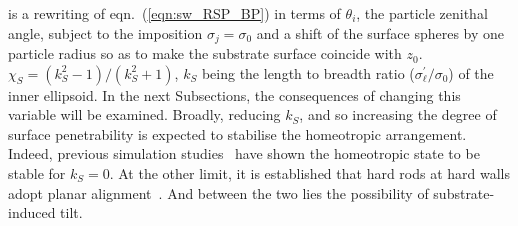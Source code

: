 \documentclass[aps,10pt,twocolumn]{revtex4}
\newcommand{\so}{\sigma_0}
\newcommand{\sel}{\sigma_\ell}
\begin{document}
is a rewriting of eqn.~(\ref{eqn:sw_RSP_BP}) in terms of $\theta_i$, the particle zenithal angle, subject to the
imposition $\sigma_j = \so $ and a shift of the surface spheres by one particle radius so as to make the substrate
surface coincide with $z_0$. $\chi_S = (k^2_S - 1)/(k^2_S + 1)$, $k_S$ being the length to breadth ratio
($\sel^{\prime}/\so$) of the inner ellipsoid. In the next Subsections, the consequences of changing this variable
will be examined. Broadly, reducing $k_S$, and so increasing the degree of surface penetrability is expected to
stabilise the homeotropic arrangement. Indeed, previous simulation studies~\cite{Allen99,BarmesCleaver04a} have
shown the homeotropic state to be stable for $k_S=0$.
At the other limit, it is established that hard rods at hard walls adopt planar
alignment~\cite{DijkstraVanRoij01}. And between the two lies the possibility of substrate-induced tilt.

\end{document}
